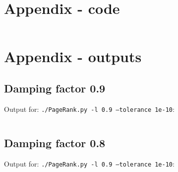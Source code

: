\appendix
\section{Appendix - code}
\inputminted{python}{./PageRank.py}
\pagebreak
\section{Appendix - outputs}%
\label{ap:out}
\subsection*{Damping factor 0.9}
Output for: \texttt{./PageRank.py -l 0.9 --tolerance 1e-10}:
\inputminted{text}{./output.txt}

\subsection*{Damping factor 0.8}
Output for: \texttt{./PageRank.py -l 0.9 --tolerance 1e-10}:
\inputminted{text}{./output_08.txt}

